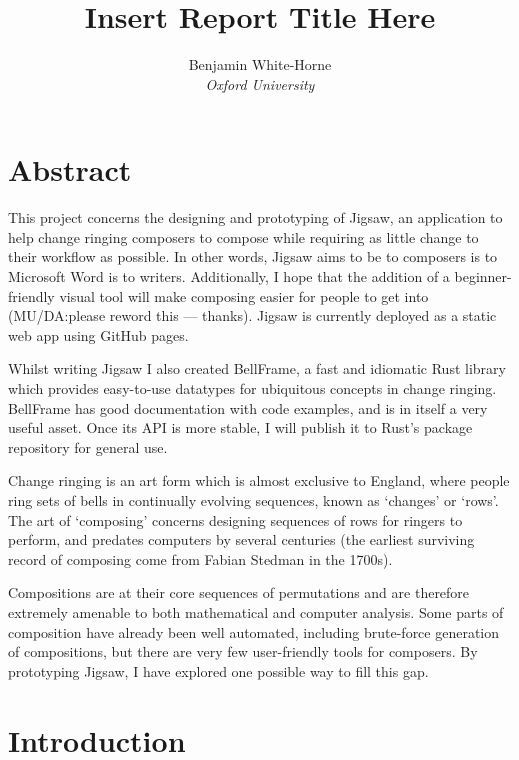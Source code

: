 \documentclass[12pt]{article}
\title{Insert Report Title Here}
\author{Benjamin White-Horne \\ \emph{Oxford University}}
\newcommand{\br}[0]{\vspace{10pt} \noindent}
\begin{document}
\maketitle



\pagebreak

\section*{Abstract}

This project concerns the designing and prototyping of Jigsaw, an application to help change ringing
composers to compose while requiring as little change to their workflow as possible.  In other
words, Jigsaw aims to be to composers is to Microsoft Word is to writers.  Additionally, I hope that
the addition of a beginner-friendly visual tool will make composing easier for people to get into
(MU/DA:\@ please reword this --- thanks).  Jigsaw is currently deployed as a static web app using
GitHub pages.

Whilst writing Jigsaw I also created BellFrame, a fast and idiomatic Rust library which provides
easy-to-use datatypes for ubiquitous concepts in change ringing.  BellFrame has good documentation
with code examples, and is in itself a very useful asset.  Once its API is more stable, I will
publish it to Rust's package repository for general use.

\br{}Change ringing is an art form which is almost exclusive to England, where people ring sets of
bells in continually evolving sequences, known as `changes' or `rows'.  The art of `composing'
concerns designing sequences of rows for ringers to perform, and predates computers by several
centuries (the earliest surviving record of composing come from Fabian Stedman in the 1700s).

Compositions are at their core sequences of permutations and are therefore extremely amenable to
both mathematical and computer analysis.  Some parts of composition have already been well
automated, including brute-force generation of compositions, but there are very few user-friendly
tools for composers.  By prototyping Jigsaw, I have explored one possible way to fill this gap.



\pagebreak

\tableofcontents



\pagebreak

\section{Introduction}
\end{document}
